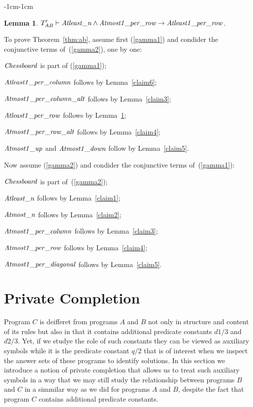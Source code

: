 \documentclass[11pt]{article}
\newtheorem{lemma}{Lemma}
\def\dOne{\mathit{Chessboard\/}}
\def\aTwofgeq{\mathit{Atleast\_n\/}}
\def\aTwofleq{\mathit{Atmost\_n\/}}
\def\aThreefs{\mathit{Atmost1\_per\_column\/}}
\def\aFourfs{\mathit{Atmost1\_per\_row\/}}
\def\aFivefs{\mathit{Atmost1\_per\_diagonal\/}}
\def\bTwofgeq{\mathit{Atleast1\_per\_column\/}}
\def\bTwofleq{\mathit{Atmost1\_per\_column\_alt\/}}
\def\bThreefgeq{\mathit{Atleast1\_per\_row\/}}
\def\bThreefleq{\mathit{Atmost1\_per\_row\_alt\/}}
\def\bFourfs{\mathit{Atmost1\_up\/}}
\def\bFivefs{\mathit{Atmost1\_down\/}}
\begin{document}
\begin{adjustwidth}{-1cm}{-1cm}
\begin{lemma}\label{claim7}
$T'_{AB}\vdash\aTwofgeq \land \aFourfs \to \bThreefgeq$.
\end{lemma}
\medskip

To prove Theorem~\ref{thm:ab}, assume first (\ref{gamma1}) and condider
the conjunctive terms of~(\ref{gamma2}), one by one:
\medskip

$\dOne$ is part of (\ref{gamma1});

$\bTwofgeq$ follows by Lemma~\ref{claim6};

$\bTwofleq$ follows by Lemma~\ref{claim3};

$\bThreefgeq$ follows by Lemma~\ref{claim7};

$\bThreefleq$ follows by Lemma~\ref{claim4};

$\bFourfs$ and $\bFivefs$ follow by Lemma~\ref{claim5}.

\medskip\noindent
Now assume (\ref{gamma2}) and condider the conjunctive terms
of~(\ref{gamma1}):
\medskip

$\dOne$ is part of~(\ref{gamma2});

$\aTwofgeq$ follows by Lemma~\ref{claim1};

$\aTwofleq$ follows by Lemma~\ref{claim2};

$\aThreefs$ follows by Lemma~\ref{claim3};

$\aFourfs$ follows by Lemma~\ref{claim4};

$\aFivefs$ follows by Lemma~\ref{claim5}.








\section{Private Completion}
Program $C$ is deifferet from programs $A$ and $B$ not only in structure and content of its rules but also in that it contains additional predicate constants $d1/3$ and $d2/3$. Yet, if we studye the role of such constants they can be viewed as auxiliary symbols while it is the predicate constant $q/2$ that is of interest when we inspect the answer sets of these programs to identify solutions. In this section we introduce a notion of private completion that allows us to treat such auxiliary symbols in a way that 
we may still study the relationship between programs  $B$ and $C$ 
in a simmilar way as we did for programs $A$ and $B$,
despite the fact that program $C$ contains additional predicate constants. 


\end{adjustwidth}
\end{document}
